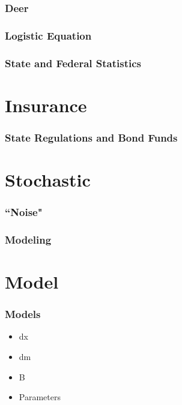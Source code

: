 \documentclass{beamer}   %
\begin{document}
\begin{frame}
    \frametitle{Deer}
\end{frame}

\begin{frame}
    \frametitle{Logistic Equation}
\end{frame}

\begin{frame}
    \frametitle{State and Federal Statistics}
\end{frame}






\section{Insurance}

\begin{frame}
    \frametitle{State Regulations and Bond Funds}
\end{frame}








\section{Stochastic}

\begin{frame}
    \frametitle{``Noise"}
\end{frame}

\begin{frame}
    \frametitle{Modeling}
\end{frame}






\section{Model}

\begin{frame}
    \frametitle{Models}
	\begin{itemize}
		\item dx
		\item dm
		\item B
		\item Parameters
	\end{itemize}
\end{frame}
\end{document}
